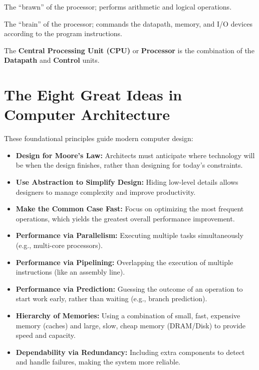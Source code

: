 \begin{vocabulary}[Datapath]
The ``brawn'' of the processor; performs arithmetic and logical operations.
\end{vocabulary}

\begin{vocabulary}[Control]
The ``brain'' of the processor; commands the datapath, memory, and I/O devices according to the program instructions.
\end{vocabulary}

\begin{remark}
The \textbf{Central Processing Unit (CPU)} or \textbf{Processor} is the combination of the \textbf{Datapath} and \textbf{Control} units.
\end{remark}

\section{The Eight Great Ideas in Computer Architecture}

These foundational principles guide modern computer design:

\begin{itemize}
    \item \textbf{Design for Moore's Law:} Architects must anticipate where technology will be when the design finishes, rather than designing for today's constraints.
    \item \textbf{Use Abstraction to Simplify Design:} Hiding low-level details allows designers to manage complexity and improve productivity.
    \item \textbf{Make the Common Case Fast:} Focus on optimizing the most frequent operations, which yields the greatest overall performance improvement.
    \item \textbf{Performance via Parallelism:} Executing multiple tasks simultaneously (e.g., multi-core processors).
    \item \textbf{Performance via Pipelining:} Overlapping the execution of multiple instructions (like an assembly line).
    \item \textbf{Performance via Prediction:} Guessing the outcome of an operation to start work early, rather than waiting (e.g., branch prediction).
    \item \textbf{Hierarchy of Memories:} Using a combination of small, fast, expensive memory (caches) and large, slow, cheap memory (DRAM/Disk) to provide speed and capacity.
    \item \textbf{Dependability via Redundancy:} Including extra components to detect and handle failures, making the system more reliable.
\end{itemize}

